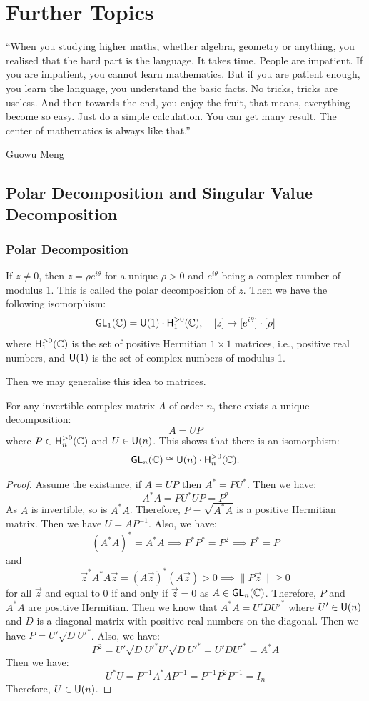 \chapter{Further Topics}

\epigraph{``When you studying higher maths, whether algebra, geometry or anything, you realised that the hard part is the language. It takes time. People are impatient. If you are impatient, you cannot learn mathematics. But if you are patient enough, you learn the language, you understand the basic facts. No tricks, tricks are useless. And then towards the end, you enjoy the fruit, that means, everything become so easy. Just do a simple calculation. You can get many result. The center of mathematics is always like that.''}{Guowu Meng}

\section{Polar Decomposition and Singular Value Decomposition}
\subsection{Polar Decomposition}
If $z \neq 0$, then $z = \rho e^{i \theta}$ for a unique $\rho > 0$ and $e^{i \theta}$ being a complex number of modulus 1. This is called the polar decomposition of $z$. Then we have the following isomorphism:
\[
	\operatorname{\text{\normalfont\sffamily GL}}_1 (\operatorname{\mathbb{C}}) = \operatorname{\text{\normalfont\sffamily U}}(1) \cdot \text{\normalfont\sffamily H}_1^{> 0} (\operatorname{\mathbb{C}}), \quad [z] \mapsto [e^{i \theta}] \cdot [\rho]
\]
where $\text{\normalfont\sffamily H}_1^{> 0} (\operatorname{\mathbb{C}})$ is the set of positive Hermitian $1 \times 1$ matrices, i.e., positive real numbers, and $\operatorname{\text{\normalfont\sffamily U}}(1)$ is the set of complex numbers of modulus 1.

Then we may generalise this idea to matrices.
\begin{theorem}
	For any invertible complex matrix $A$ of order $n$, there exists a unique decomposition:
	\begin{equation}
		A = U P
	\end{equation}
	where $P \in \text{\normalfont\sffamily H}_n^{> 0} (\operatorname{\mathbb{C}})$ and $U \in \operatorname{\text{\normalfont\sffamily U}}(n)$. This shows that there is an isomorphism:
	\[
		\operatorname{\text{\normalfont\sffamily GL}}_n (\operatorname{\mathbb{C}}) \cong \operatorname{\text{\normalfont\sffamily U}}(n) \cdot \text{\normalfont\sffamily H}_n^{> 0} (\operatorname{\mathbb{C}}).
	\]
\end{theorem}
\begin{proof}
	Assume the existance, if $A = U P$ then $A^* = P U^*$. Then we have:
	\[
		A^* A = P U^* U P = P^2
	\]
	As $A$ is invertible, so is $A^* A$. Therefore, $P = \sqrt{A^* A}$ is a positive Hermitian matrix. Then we have $U = A P^{-1}$. Also, we have:
	\[
		{(A^* A)}^* = A^* A \implies P^* P^* = P^2 \implies P^* = P
	\]
	and
	\[
		\vec{z}^* A^* A \vec{z} = {(A \vec{z})}^* (A \vec{z}) > 0 \implies \| P \vec{z} \| \geq 0
	\]
	for all $\vec{z}$ and equal to 0 if and only if $\vec{z} = 0$ as $A \in \operatorname{\text{\normalfont\sffamily GL}}_n(\operatorname{\mathbb{C}})$. Therefore, $P$ and $A^* A$ are positive Hermitian. Then we know that $A^* A = U' D U'^*$ where $U' \in \operatorname{\text{\normalfont\sffamily U}}(n)$ and $D$ is a diagonal matrix with positive real numbers on the diagonal. Then we have $P = U' \sqrt{D} U'^*$. Also, we have:
	\[
		P^2 = U' \sqrt{D} U'^* U' \sqrt{D} U'^* = U' D U'^* = A^* A
	\]
	Then we have:
	\[
		U^* U = P^{-1} A^* A P^{-1} = P^{-1} P^2 P^{-1} = I_n
	\]
	Therefore, $U \in \operatorname{\text{\normalfont\sffamily U}}(n)$.
\end{proof}


